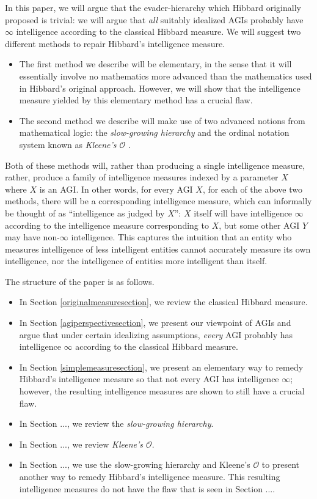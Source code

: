 \documentclass{article}
\begin{document}
In this paper, we will argue that the evader-hierarchy which Hibbard originally proposed is
trivial: we will argue that \emph{all} suitably idealized AGIs probably have $\infty$
intelligence according to the classical Hibbard measure.
We will suggest two different methods to repair Hibbard's intelligence measure.
\begin{itemize}
    \item
    The first method we describe will be elementary, in the sense that it will
    essentially involve
    no mathematics more advanced than the mathematics used in Hibbard's original approach.
    However, we will show that the intelligence measure yielded by this elementary
    method has a crucial flaw.
    \item
    The second method we describe will make use of two advanced notions from
    mathematical logic: the \emph{slow-growing hierarchy}
    \cite{weiermann2002slow} and the ordinal notation system known as
    \emph{Kleene's $\mathcal O$} \cite{kleene1938notation}.
\end{itemize}
Both of these methods will, rather than producing a single intelligence measure,
rather, produce a family of intelligence measures indexed by a parameter $X$ where
$X$ is an AGI. In other words, for every AGI $X$, for each of the above two methods,
there will be a corresponding intelligence measure, which can informally be thought
of as ``intelligence as judged by $X$'': $X$ itself will have intelligence $\infty$
according to the intelligence measure corresponding to $X$, but some other AGI $Y$
may have non-$\infty$ intelligence. This captures the intuition that an entity who
measures intelligence of less intelligent entities cannot accurately measure
its own intelligence, nor the intelligence of entities more intelligent than itself.

The structure of the paper is as follows.
\begin{itemize}
    \item
    In Section \ref{originalmeasuresection}, we review the classical Hibbard measure.
    \item
    In Section \ref{agiperspectivesection}, we present our viewpoint of AGIs and argue that
    under certain idealizing assumptions, \emph{every} AGI probably has intelligence
    $\infty$ according to the classical Hibbard measure.
    \item
    In Section \ref{simplemeasuresection}, we present an elementary way to
    remedy Hibbard's intelligence
    measure so that not every AGI has intelligence $\infty$; however, the resulting
    intelligence measures are shown to still have a crucial flaw.
    \item
    In Section ..., we review the \emph{slow-growing hierarchy}.
    \item
    In Section ..., we review \emph{Kleene's $\mathcal O$}.
    \item
    In Section ..., we use the slow-growing hierarchy and Kleene's $\mathcal O$
    to present another way to
    remedy Hibbard's intelligence measure. This resulting intelligence measures do not
    have the flaw that is seen in Section ....
\end{itemize}
\end{document}
